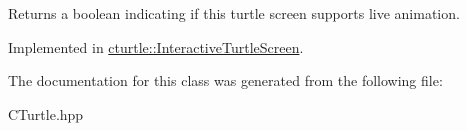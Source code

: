 \begin{DoxyReturn}{Returns}
a boolean indicating if this turtle screen supports live animation. 
\end{DoxyReturn}


Implemented in \hyperlink{classcturtle_1_1InteractiveTurtleScreen_ad28f7c6e4058541a2c4258b4455fad74}{cturtle\+::\+Interactive\+Turtle\+Screen}.



The documentation for this class was generated from the following file\+:\begin{DoxyCompactItemize}
\item 
C\+Turtle.\+hpp\end{DoxyCompactItemize}
